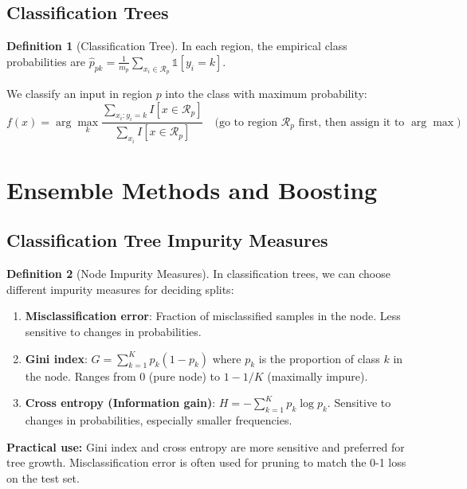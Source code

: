 \documentclass[12pt,a4paper]{article}
\theoremstyle{definition}
\newtheorem{definition}{Definition}[section]
\begin{document}
\subsection{Classification Trees}

\begin{definition}[Classification Tree]
In each region, the empirical class probabilities are $\hat{p}_{pk} = \frac{1}{m_p} \sum_{x_i \in \mathcal{R}_p} \mathbb{1}[y_i = k]$.

We classify an input in region $p$ into the class with maximum probability:
\[
f(x) = \arg\max_k \frac{\sum_{x_i: y_i=k} I[x \in \mathcal{R}_p]}{\sum_{x_i} I[x \in \mathcal{R}_p]} \quad \text{(go to region } \mathcal{R}_p \text{ first, then assign it to } \arg\max)
\]
\end{definition}

\newpage


\section{Ensemble Methods and Boosting}

\subsection{Classification Tree Impurity Measures}

\begin{definition}[Node Impurity Measures]
In classification trees, we can choose different impurity measures for deciding splits:

\begin{enumerate}
    \item \textbf{Misclassification error}: Fraction of misclassified samples in the node. Less sensitive to changes in probabilities.
    
    \item \textbf{Gini index}: $G = \sum_{k=1}^K p_k(1 - p_k)$ where $p_k$ is the proportion of class $k$ in the node. Ranges from 0 (pure node) to $1 - 1/K$ (maximally impure).
    
    \item \textbf{Cross entropy (Information gain)}: $H = -\sum_{k=1}^K p_k \log p_k$. Sensitive to changes in probabilities, especially smaller frequencies.
\end{enumerate}

\textbf{Practical use:} Gini index and cross entropy are more sensitive and preferred for tree growth. Misclassification error is often used for pruning to match the 0-1 loss on the test set.
\end{definition}
\end{document}
